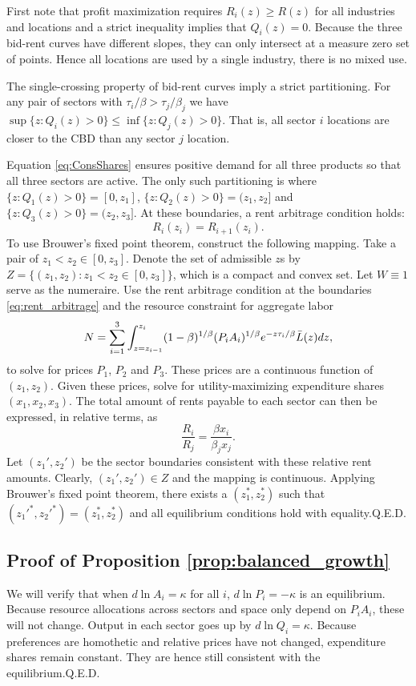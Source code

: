 \documentclass[12pt]{article}
\begin{document}
First note that profit maximization requires $R_i(z)\ge R(z)$ for all industries and locations and a strict inequality implies that $Q_i(z)=0$. Because the three bid-rent curves have different slopes, they can only intersect at a measure zero set of points. Hence all locations are used by a single industry, there is no mixed use.

The single-crossing property of bid-rent curves imply a strict partitioning. For any pair of sectors with $\tau_i/\beta>\tau_j/\beta_j$ we have $\sup\{z: Q_i(z)>0\} \le \inf\{z: Q_j(z)>0\}$. That is, all sector $i$ locations are closer to the CBD than any sector $j$ location. 

Equation \eqref{eq:ConsShares} ensures positive demand for all three products so that all three sectors are active. The only such partitioning is where $\{z: Q_1(z)>0\} = [0,z_1]$, $\{z: Q_2(z)>0\} = (z_1,z_2]$ and $\{z: Q_3(z)>0\} = (z_2,z_3]$. At these boundaries, a rent arbitrage condition holds:
\begin{equation}\label{eq:rent_arbitrage}
	R_i(z_i) = R_{i+1}(z_i).
\end{equation}
To use Brouwer's fixed point theorem, construct the following mapping. Take a pair of $z_1<z_2 \in [0,z_3]$. Denote the set of admissible $z$s by $Z=\{(z_1,z_2): z_1<z_2 \in [0,z_3]\}$, which is a compact and convex set. Let $W\equiv 1$ serve as the numeraire. Use the rent arbitrage condition at the boundaries \eqref{eq:rent_arbitrage} and the resource constraint for aggregate labor
\[
N = \sum_{i=1}^3 \int_{z=z_{i-1}}^{z_i}(1-\beta)^{1/\beta}
	(P_iA_i)^{1/\beta}
	e^{- z \tau_i/\beta}\Bar L(z)dz,
\] 
to solve for prices $P_1$, $P_2$ and $P_3$. These prices are a continuous function of $(z_1,z_2)$. 
Given these prices, solve for utility-maximizing expenditure shares $(x_1,x_2,x_3)$. The total amount of rents payable to each sector can then be expressed, in relative terms, as
\[
\frac {R_i}
	{R_j}
=
\frac {\beta x_i}
	{\beta_j x_j}.
\]
Let $(z_1',z_2')$ be the sector boundaries consistent with these relative rent amounts. Clearly, $(z_1',z_2')\in Z$ and the mapping is continuous. Applying Brouwer's fixed point theorem, there exists a $(z_1^*,z_2^*)$ such that $(z_1'^{*},z_2'^{*}) = (z_1^*,z_2^*)$ and all equilibrium conditions hold with equality.\hfill Q.E.D.

\subsection{Proof of Proposition \ref{prop:balanced_growth}}
We will verify that when $d\ln A_i=\kappa$ for all $i$, $d\ln P_i=-\kappa$ is an equilibrium. Because resource allocations across sectors and space only depend on $P_iA_i$, these will not change. Output in each sector goes up by $d\ln Q_i = \kappa$. Because preferences are homothetic and relative prices have not changed, expenditure shares remain constant. They are hence still consistent with the equilibrium.\hfill Q.E.D.
\end{document}
